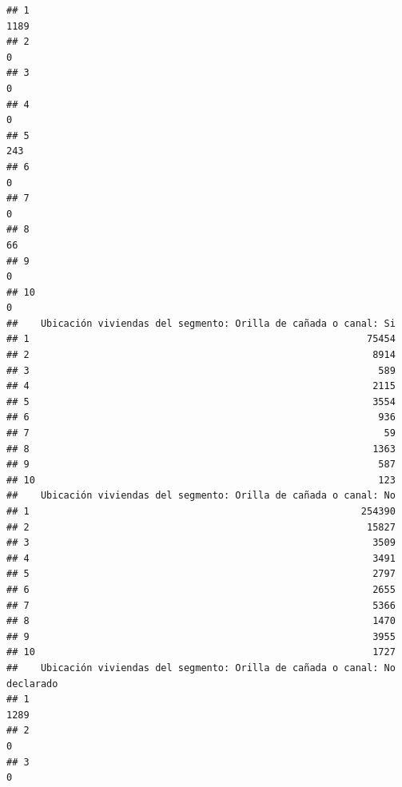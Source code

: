\documentclass[11pt,]{article}
\begin{document}
\begin{verbatim}
## 1                                                                    1189
## 2                                                                       0
## 3                                                                       0
## 4                                                                       0
## 5                                                                     243
## 6                                                                       0
## 7                                                                       0
## 8                                                                      66
## 9                                                                       0
## 10                                                                      0
##    Ubicación viviendas del segmento: Orilla de cañada o canal: Si
## 1                                                           75454
## 2                                                            8914
## 3                                                             589
## 4                                                            2115
## 5                                                            3554
## 6                                                             936
## 7                                                              59
## 8                                                            1363
## 9                                                             587
## 10                                                            123
##    Ubicación viviendas del segmento: Orilla de cañada o canal: No
## 1                                                          254390
## 2                                                           15827
## 3                                                            3509
## 4                                                            3491
## 5                                                            2797
## 6                                                            2655
## 7                                                            5366
## 8                                                            1470
## 9                                                            3955
## 10                                                           1727
##    Ubicación viviendas del segmento: Orilla de cañada o canal: No declarado
## 1                                                                      1289
## 2                                                                         0
## 3                                                                         0

\end{verbatim}
\end{document}
